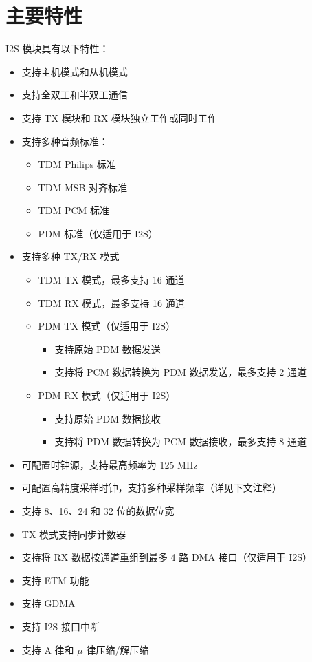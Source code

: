 \documentclass[main\_\_CN.tex]{subfiles}
\begin{document}
\section{主要特性}
\label{sec:i2s-features}

I2S 模块具有以下特性：

\begin{itemize}
    \item 支持主机模式和从机模式
    \item 支持全双工和半双工通信
    \item 支持 TX 模块和 RX 模块独立工作或同时工作
    \item 支持多种音频标准：
        \begin{itemize}    
            \item TDM Philips 标准
            \item TDM MSB 对齐标准
            \item TDM PCM 标准
            \item PDM 标准（仅适用于 I2S）
        \end{itemize}
    \item 支持多种 TX/RX 模式
        \begin{itemize}
        \item TDM TX 模式，最多支持 16 通道
        \item TDM RX 模式，最多支持 16 通道
        \item PDM TX 模式（仅适用于 I2S）
        \begin{itemize}
            \item 支持原始 PDM 数据发送
            \item 支持将 PCM 数据转换为 PDM 数据发送，最多支持 2 通道
        \end{itemize}
        \item PDM RX 模式（仅适用于 I2S）
        \begin{itemize}
            \item 支持原始 PDM 数据接收
            \item 支持将 PDM 数据转换为 PCM 数据接收，最多支持 8 通道
        \end{itemize}
        \end{itemize}
    \item 可配置时钟源，支持最高频率为 125 MHz 
    \item 可配置高精度采样时钟，支持多种采样频率（详见下文注释）
    \item 支持 8、16、24 和 32 位的数据位宽
    \item TX 模式支持同步计数器
    \item 支持将 RX 数据按通道重组到最多 4 路 DMA 接口（仅适用于 I2S）
    \item 支持 ETM 功能
    \item 支持 GDMA
    \item 支持 I2S 接口中断
    \item 支持 A 律和 $\mu$ 律压缩/解压缩
\end{itemize}
\end{document}
